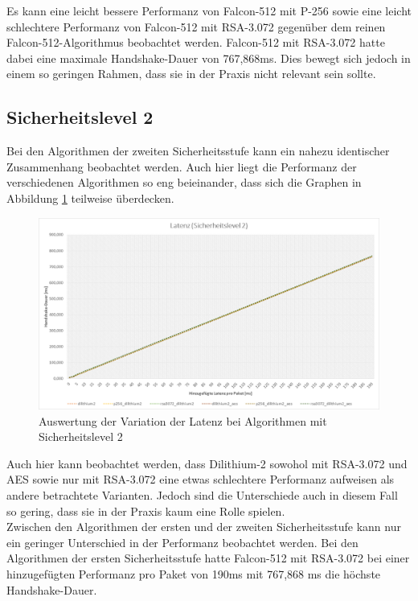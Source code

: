 		Es kann eine leicht bessere Performanz von Falcon-512 mit P-256 sowie eine leicht schlechtere 						Performanz von Falcon-512 mit RSA-3.072 gegenüber dem reinen Falcon-512-Algorithmus beobachtet werden. Falcon-512 mit RSA-3.072 hatte dabei eine maximale Handshake-Dauer von 767,868ms. 			Dies bewegt sich jedoch in einem so geringen Rahmen, dass sie in der Praxis nicht relevant sein sollte.
		
		\subsection{Sicherheitslevel 2}
		\label{subsec:ergebnis:latenz:sl2}
		
		Bei den Algorithmen der zweiten Sicherheitsstufe kann ein nahezu identischer Zusammenhang beobachtet 				werden. Auch hier liegt die Performanz der verschiedenen Algorithmen so eng beieinander, dass sich die 			Graphen in Abbildung \ref{fig:ergebnis:latenz:sl2} teilweise überdecken.\\
		
		\begin{figure}[htbp]
			\centering
			\includegraphics[width=\textwidth]{../auswertung/latenz_sl2.png}
			\caption{Auswertung der Variation der Latenz bei Algorithmen mit Sicherheitslevel 2}
			\label{fig:ergebnis:latenz:sl2}
		\end{figure}
		
		Auch hier kann beobachtet werden, dass Dilithium-2 sowohol mit RSA-3.072 und AES sowie nur mit 					RSA-3.072 eine etwas schlechtere Performanz aufweisen als andere betrachtete Varianten. Jedoch sind die 		Unterschiede auch in diesem Fall so gering, dass sie in der Praxis kaum eine Rolle spielen.\\
		
		Zwischen den Algorithmen der ersten und der zweiten Sicherheitsstufe kann nur ein geringer Unterschied 			in der Performanz beobachtet werden. Bei den Algorithmen der ersten Sicherheitsstufe hatte Falcon-512 				mit RSA-3.072 bei einer hinzugefügten Performanz pro Paket von 190ms mit 767,868 ms die höchste 					Handshake-Dauer.\\
		
